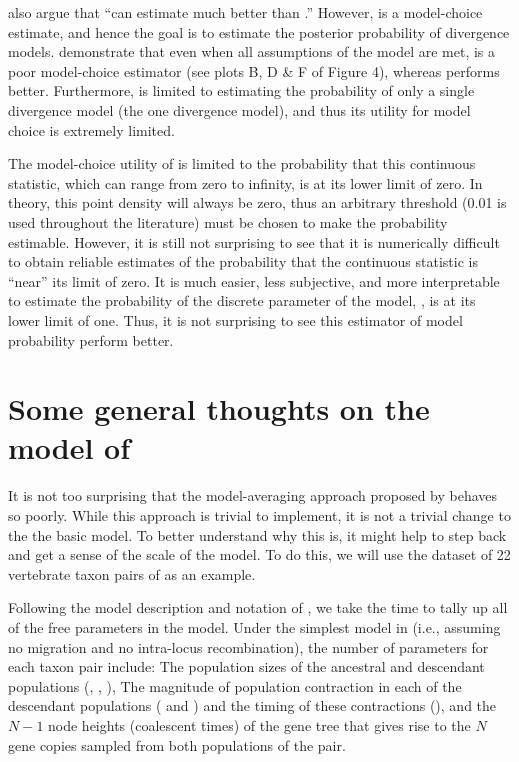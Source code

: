 \documentclass[letterpaper,12pt]{article}
\begin{document}
\begin{linenumbers}
\citet{Hickerson2013} also argue that ``\msb can estimate \vmratio{} much
better than \numt{}.''
However, \msb is a model-choice estimate, and hence the goal is to estimate the
posterior probability of divergence models.
\citet{Oaks2012} demonstrate that even when all assumptions of the model are
met, \vmratio is a poor model-choice estimator (see plots B, D \& F of Figure
4), whereas \numt{} performs better.
Furthermore, \vmratio{} is limited to estimating the probability of only a
single divergence model (the one divergence model), and thus its utility for
model choice is extremely limited.

The model-choice utility of \vmratio{} is limited to the probability that
this continuous statistic, which can range from zero to infinity, is at its lower
limit of zero. In theory, this point density will always be zero, thus an
arbitrary threshold (0.01 is used throughout the \msb literature) must 
be chosen to make the probability estimable.
However, it is still not surprising to see that it is numerically difficult to
obtain reliable estimates of the probability that the continuous \vmratio{}
statistic is ``near'' its limit of zero.
It is much easier, less subjective, and more interpretable to estimate
the probability of the discrete parameter of the model, \numt{}, is
at its lower limit of one.
Thus, it is not surprising to see this estimator of model probability
perform better.


\section*{Some general thoughts on the model of \msb}
It is not too surprising that the model-averaging approach proposed by
\citet{Hickerson2013} behaves so poorly.
While this approach is trivial to implement, it is not a trivial change
to the the basic \msb model.
To better understand why this is, it might help to step back and get a
sense of the scale of the \msb model.
To do this, we will use the dataset of 22 vertebrate taxon pairs of
\citet{Oaks2012} as an example.

Following the model description and notation of \citet{Oaks2012}, we
take the time to tally up all of the free parameters in the \msb model.
Under the simplest model in \msb (i.e., assuming no migration and
no intra-locus recombination), the number of parameters for each
taxon pair include:
The population sizes of the ancestral and descendant populations
(\ancestralTheta{}, , ),
The magnitude of population contraction in each of the descendant
populations ( and ) and the
timing of these contractions (\bottleTime{}), and the $N-1$ node heights
(coalescent times) of the gene tree that gives rise to the $N$ gene
copies sampled from both populations of the pair.


\end{linenumbers}
\end{document}
